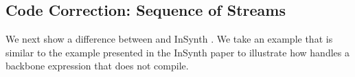%
%
%
%


\subsection{Code Correction: Sequence of Streams}

We next show a difference between \ourTool and InSynth 
\cite{GveroETAL13CompleteCompletionTypesWeights}. We take an example
that is similar to the example presented in the InSynth paper to illustrate
how \ourTool handles a backbone 
expression that does not compile. 

